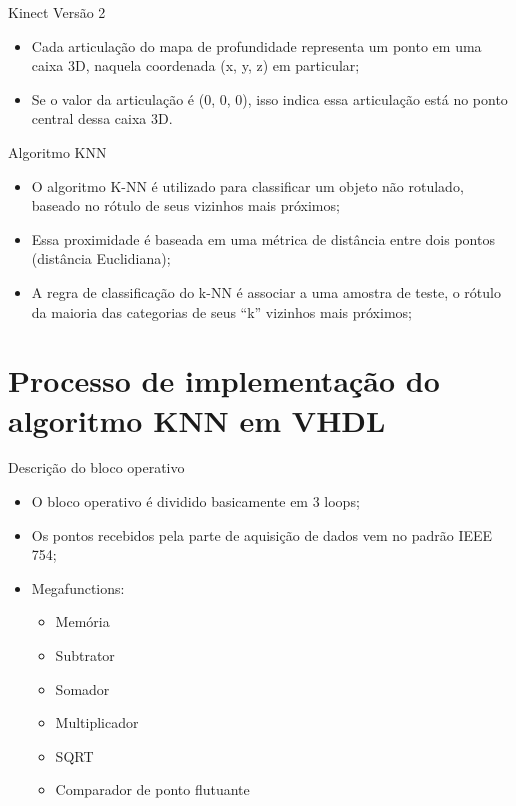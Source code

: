 \documentclass[11pt]{beamer}
\begin{document}
\begin{frame}{Kinect Versão 2}

\begin{itemize}
	\item Cada articulação do mapa de profundidade representa um ponto em uma
	caixa 3D, naquela coordenada (x, y, z) em particular;
	\item Se o valor da articulação é (0, 0, 0), isso indica essa articulação
	está no ponto central dessa caixa 3D.
\end{itemize}

\end{frame}

\begin{frame}{Algoritmo KNN}

\begin{itemize}
	\item O algoritmo K-NN é utilizado para classificar um objeto não rotulado,
	baseado no rótulo de seus vizinhos mais próximos;
	\item Essa proximidade é baseada em uma métrica de distância entre dois
	pontos (distância Euclidiana);
	\item A regra de classificação do k-NN é associar a uma amostra de teste, o
	rótulo da maioria das categorias de seus “k” vizinhos mais próximos;
\end{itemize}

\end{frame}


\section{Processo de implementação do algoritmo KNN em VHDL}
\begin{frame}{Descrição do bloco operativo}
	\begin{itemize}
	\item O bloco operativo é dividido basicamente em 3 loops;
	\item Os pontos recebidos pela parte de aquisição de dados vem no padrão
	IEEE 754;
	\item Megafunctions:
		\begin{itemize}
		\item Memória
		\item Subtrator
		\item Somador
		\item Multiplicador
		\item SQRT
		\item Comparador de ponto flutuante
		\end{itemize}
	\end{itemize}
\end{frame}
\end{document}
